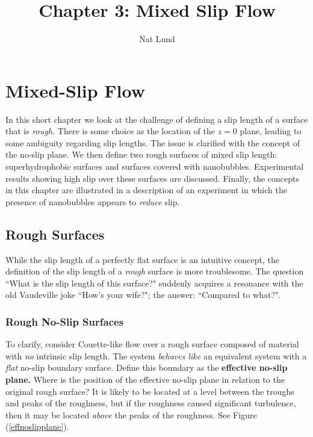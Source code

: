 \documentclass[12pt, a4paper, twoside, openright]{book}
\title{Chapter 3: Mixed Slip Flow}
\author{Nat Lund}
\begin{document}
\chapter{Mixed-Slip Flow}\label{C:mixedslip}

In this short chapter we look at the challenge of defining a slip length of a surface that is \emph{rough.}   There is some choice as the location of the $z=0$ plane, leading to some ambiguity regarding slip lengths.  The issue is clarified with the concept of the no-slip plane.    We then define two rough surfaces of mixed slip length: superhydrophobic surfaces and surfaces covered with nanobubbles.  Experimental results showing high slip over these surfaces are discussed.  Finally, the concepts in this chapter are illustrated in a description of an experiment in which the presence of nanobubbles appears to \emph{reduce} slip.

\clearpage
\section{Rough Surfaces}

While the slip length of a perfectly flat surface is an intuitive concept, the definition of the slip length of a \emph{rough} surface is more troublesome.  The question ``What is the slip length of this surface?" suddenly acquires a resonance with the old Vaudeville joke ``How's your wife?";  the answer: ``Compared to what?".


\subsection{Rough No-Slip Surfaces}

To clarify, consider Couette-like flow over a rough surface composed of material with \emph{no} intrinsic slip length.  The system \emph{behaves like} an equivalent system with a \emph{flat} no-slip boundary surface.  Define this boundary as the \textbf{effective no-slip plane.}  Where is the position of the effective no-slip plane in relation to the original rough surface?  It is likely to be located at a  level between the troughs and peaks of the roughness, but if the roughness caused significant turbulence, then it may be located \emph{above} the peaks of the roughness.  See Figure (\ref{effnoslipplane}).
\end{document}

